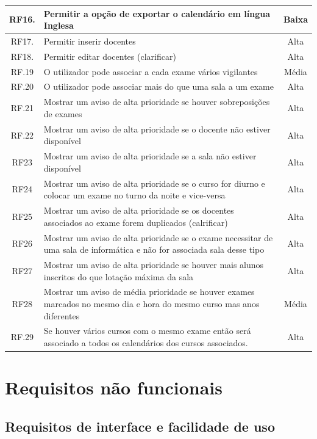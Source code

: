 \documentclass[11pt, twoside]{report}
\begin{document}
\begin{table}[H]
\begin{center}
\begin{tabularx}{\textwidth}{|c|X|c|}
				\hline
				RF16. & Permitir a opção de exportar o calendário em língua Inglesa & Baixa \\
				\hline
				RF17. & Permitir inserir docentes &Alta\\
				\hline
				RF18. & Permitir editar docentes (clarificar) & Alta\\
				\hline
				RF.19 &O utilizador pode associar a cada exame vários vigilantes&Média\\
				\hline
				RF.20 &	O utilizador pode associar mais do que uma sala a um exame&Alta\\
				\hline
				RF.21 &Mostrar um aviso de alta prioridade se houver sobreposições de exames &Alta\\
				\hline
				RF.22&Mostrar um aviso de alta prioridade se o docente não estiver disponível&Alta\\
				\hline
				RF23&Mostrar um aviso de alta prioridade se a sala não estiver disponível&Alta\\
				\hline
				RF24&Mostrar um aviso de alta prioridade se o curso for diurno e colocar um exame no turno da noite e vice-versa & Alta\\
				\hline
				RF25&Mostrar um aviso de alta prioridade se os docentes associados ao exame forem duplicados (calrificar)& Alta\\
				\hline
				RF26&Mostrar um aviso de alta prioridade se o exame necessitar de uma sala de informática e não for associada sala desse tipo&Alta\\
				\hline
				RF27&Mostrar um aviso de alta prioridade se houver mais alunos inscritos do que  lotação máxima da sala&Alta\\
				\hline
				RF28&Mostrar um aviso de média prioridade se houver exames marcados no mesmo dia e hora do mesmo curso mas anos diferentes&Média\\
				\hline
				RF.29&Se houver vários cursos com o mesmo exame então será associado a todos os calendários dos cursos associados. &Alta\\
				\hline
			\end{tabularx}
	\end{center}
\end{table}

	
	\section{Requisitos não funcionais}
	\subsection{Requisitos de interface e facilidade de uso}
		
\end{document}
